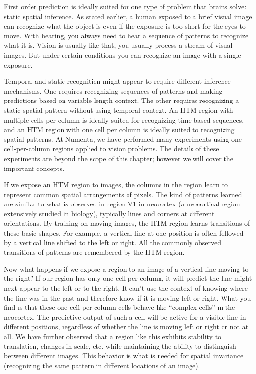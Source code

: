 \documentclass{report}
\begin{document}
First order prediction is ideally suited for one type of problem that
brains solve: static spatial inference. As stated earlier, a human
exposed to a brief visual image can recognize what the object is even
if the exposure is too short for the eyes to move. With hearing, you
always need to hear a sequence of patterns to recognize what it
is. Vision is usually like that, you usually process a stream of
visual images. But under certain conditions you can recognize an image
with a single exposure.

Temporal and static recognition might appear to require different
inference mechanisms. One requires recognizing sequences of patterns
and making predictions based on variable length context. The other
requires recognizing a static spatial pattern without using temporal
context. An HTM region with multiple cells per column is ideally
suited for recognizing time-based sequences, and an HTM region with
one cell per column is ideally suited to recognizing spatial
patterns. At Numenta, we have performed many experiments using
one-cell-per-column regions applied to vision problems. The details of
these experiments are beyond the scope of this chapter; however we
will cover the important concepts.

If we expose an HTM region to images, the columns in the region learn
to represent common spatial arrangements of pixels. The kind of
patterns learned are similar to what is observed in region V1 in
neocortex (a neocortical region extensively studied in biology),
typically lines and corners at different orientations. By training on
moving images, the HTM region learns transitions of these basic
shapes. For example, a vertical line at one position is often followed
by a vertical line shifted to the left or right. All the commonly
observed transitions of patterns are remembered by the HTM region.

Now what happens if we expose a region to an image of a vertical line
moving to the right? If our region has only one cell per column, it
will predict the line might next appear to the left or to the
right. It can't use the context of knowing where the line was in the
past and therefore know if it is moving left or right. What you find
is that these one-cell-per-column cells behave like ``complex cells''
in the neocortex. The predictive output of such a cell will be active
for a visible line in different positions, regardless of whether the
line is moving left or right or not at all. We have further observed
that a region like this exhibits stability to translation, changes in
scale, etc. while maintaining the ability to distinguish between
different images. This behavior is what is needed for spatial
invariance (recognizing the same pattern in different locations of an
image).
\end{document}
